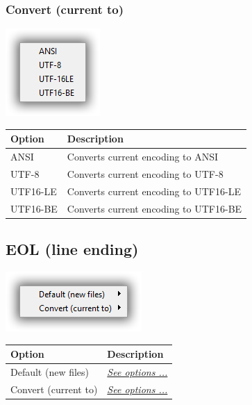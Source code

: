 \hypertarget{menu_format_encoding_convert}{}
\subsubsection{Convert (current to)}

\includegraphics[scale=0.50]{./res/encoding.png}\\

\begin{scriptsize}
  \begin{tabularx}{\textwidth}{>{\hsize=0.3\hsize}X>{\hsize=0.7\hsize}X}\\
    \hline
    \textbf{Option} & \textbf{Description} \\
    \hline
    ANSI & Converts current encoding to ANSI \\
    UTF-8 & Converts current encoding to UTF-8 \\
    UTF16-LE & Converts current encoding to UTF16-LE \\
    UTF16-BE & Converts current encoding to UTF16-BE \\
    \hline
  \end{tabularx}
\end{scriptsize}


\hypertarget{menu_format_eol}{}
\subsection{EOL (line ending)}

\includegraphics[scale=0.50]{./res/menu_format_eol.png}\\

\begin{scriptsize}
  \begin{tabularx}{\textwidth}{>{\hsize=0.4\hsize}X>{\hsize=0.6\hsize}X}\\
    \hline
    \textbf{Option} & \textbf{Description} \\
    \hline
    Default (new files) & \textit{\href{\#menu\_format\_eol\_default}{See options ...}} \\
    Convert (current to) & \textit{\href{\#menu\_format\_eol\_convert}{See options ...}} \\
    \hline
  \end{tabularx}
\end{scriptsize}


